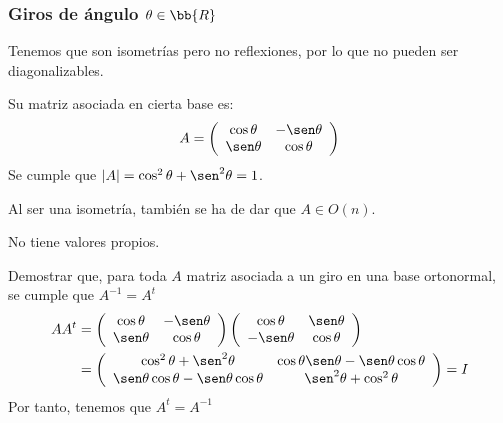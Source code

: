 \subsubsection{Giros de ángulo $\theta \in \bb{R}$}

Tenemos que son isometrías pero no reflexiones, por lo que no pueden ser diagonalizables.

Su matriz asociada en cierta base es:
\begin{equation*}
    A=\left(\begin{array}{cc}
            \cos \theta & -\sen \theta \\
            \sen \theta & \cos \theta
        \end{array}\right)
\end{equation*}
Se cumple que $|A|=\cos^2\theta +\sen^2\theta = 1$.

Al ser una isometría, también se ha de dar que $A\in O(n)$.

No tiene valores propios.
\begin{ejercicio}
    Demostrar que, para toda $A$ matriz asociada a un giro en una base ortonormal, se cumple que $A^{-1}=A^t$
    \begin{equation*}\begin{split}
        AA^t&
        =\left(\begin{array}{cc}
            \cos \theta & -\sen \theta \\
            \sen \theta & \cos \theta
        \end{array}\right)
        \left(\begin{array}{cc}
            \cos \theta & \sen \theta \\
            -\sen \theta & \cos \theta
        \end{array}\right) \\
        &= \left(\begin{array}{cc}
            \cos^2 \theta + \sen^2\theta & \cos \theta \sen \theta -\sen\theta \cos\theta \\
            \sen \theta \cos \theta -\sen\theta \cos\theta & \sen^2 \theta + \cos^2\theta
        \end{array}\right) = I
    \end{split}\end{equation*}
    Por tanto, tenemos que $A^t=A^{-1}$
\end{ejercicio}

